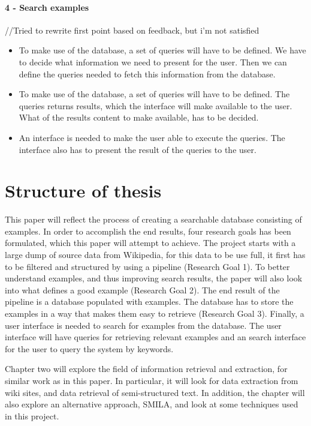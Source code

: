 \paragraph{4 - Search examples }
//Tried to rewrite first point based on feedback, but i'm not satisfied
\begin{itemize}
    \item To make use of the database, a set of queries will have to be defined. We have to decide what information we need to present for the user. Then we can define the queries needed to fetch this information from the database.
    \item To make use of the database, a set of queries will have to be defined. The queries returns results, which the interface will make available to the user. What of the results content to make available, has to be decided.
    \item An interface is needed to make the user able to execute the queries. The interface also has to present the result of the queries to the user.
\end{itemize}


\section{Structure of thesis}
This paper will reflect the process of creating a searchable database consisting of examples. In order to accomplish the end results, four research goals has been formulated, which this paper will attempt to achieve. The project starts with a large dump of source data from Wikipedia, for this data to be use full, it first has to be filtered and structured by using a pipeline (Research Goal 1). To better understand examples, and thus improving search results, the paper will also look into what defines a good example (Research Goal 2). The end result of the pipeline is a database populated with examples. The database has to store the examples in a way that makes them easy to retrieve (Research Goal 3). Finally, a user interface is needed to search for examples from the database. The user interface will have queries for retrieving relevant examples and an search interface for the user to query the system by keywords. 

Chapter two will explore the field of information retrieval and extraction, for similar work as in this paper. In particular, it will look for data extraction from wiki sites, and data retrieval of semi-structured text. In addition, the chapter will also explore an alternative approach, SMILA, and look at some techniques used in this project.

